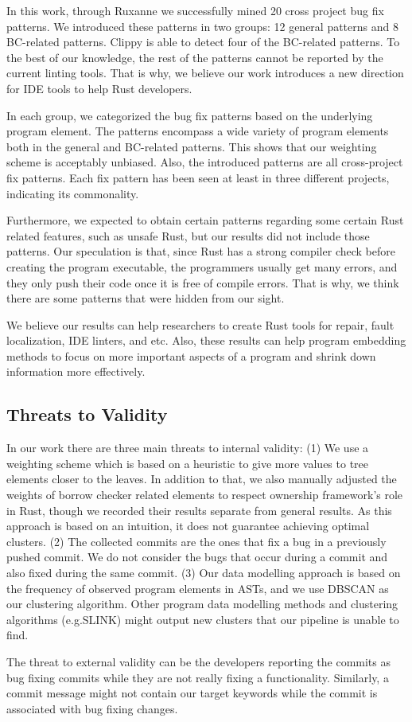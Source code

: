 In this work, through Ruxanne we successfully mined 20 cross project bug fix patterns. We introduced these patterns in two groups: 12 general patterns and 8 BC-related patterns. Clippy is able to detect four of the BC-related patterns. To the best of our knowledge, the rest of the patterns cannot be reported by the current linting tools. That is why, we believe our work introduces a new direction for IDE tools to help Rust developers.

In each group, we categorized the bug fix patterns based on the underlying program element. The patterns encompass a wide variety of program elements both in the general and BC-related patterns. This shows that our weighting scheme is acceptably unbiased. Also, the introduced patterns are all cross-project fix patterns. Each fix pattern has been seen at least in three different projects, indicating its commonality.

Furthermore, we expected to obtain certain patterns regarding some certain Rust related features, such as unsafe Rust, but our results did not include those patterns. Our speculation is that, since Rust has a strong compiler check before creating the program executable, the programmers usually get many errors, and they only push their code once it is free of compile errors. That is why, we think there are some patterns that were hidden from our sight.

We believe our results can help researchers to create Rust tools for repair, fault localization, IDE linters, and etc. Also, these results can help program embedding methods to focus on more important aspects of a program and shrink down information more effectively.

\subsection{Threats to Validity}

In our work there are three main threats to internal validity: (1) We use a weighting scheme which is based on a heuristic to give more values to tree elements closer to the leaves. In addition to that, we also manually adjusted the weights of borrow checker related elements to respect ownership framework's role in Rust, though we recorded their results separate from general results. As this approach is based on an intuition, it does not guarantee achieving optimal clusters. (2) The collected commits are the ones that fix a bug in a previously pushed commit. We do not consider the bugs that occur during a commit and also fixed during the same commit. (3) Our data modelling approach is based on the frequency of observed program elements in ASTs, and we use DBSCAN as our clustering algorithm. Other program data modelling methods and clustering algorithms (e.g.SLINK) might output new clusters that our pipeline is unable to find. 

The threat to external validity can be the developers reporting the commits as bug fixing commits while they are not really fixing a functionality. Similarly, a commit message might not contain our target keywords while the commit is associated with bug fixing changes.
